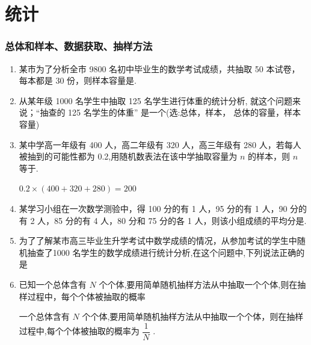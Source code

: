 \chapter{统计}

\subsection*{总体和样本、数据获取、抽样方法}
\begin{enumerate}
    \item 某市为了分析全市 9800 名初中毕业生的数学考试成绩，共抽取 50 本试卷， 每本都是 30 份，则样本容量是.
    
    \item 从某年级 1000 名学生中抽取 125 名学生进行体重的统计分析, 就这个问题来说；“抽查的 125 名学生的体重” 是一个(选:总体，样本， 总体的容量，样本容量)

    \item 某中学高一年级有 400 人，高二年级有 320 人，高三年级有 280 人，若每人被抽到的可能性都为 0.2,用随机数表法在该中学抽取容量为 $n$ 的样本，则 $n$ 等于.
    \begin{jieda}
        $0.2 \times (400+320+280) = 200$
    \end{jieda}

    \item 某学习小组在一次数学测验中，得 100 分的有 1 人，95 分的有 1 人，90 分的有 2 人，85 分的有 4 人，80 分和 75 分的各 1 人，则该小组成绩的平均分是.

    \item 为了了解某市高三毕业生升学考试中数学成绩的情况，从参加考试的学生中随机抽查了1000 名学生的数学成绩进行统计分析,在这个问题中,下列说法正确的是
    
    \item 已知一个总体含有 ${N}$ 个个体,要用简单随机抽样方法从中抽取一个个体,则在抽样过程中，每个个体被抽取的概率
    \begin{jieda}
        一个总体含有 $N$ 个个体,要用简单随机抽样方法从中抽取一个个体，则在抽样过程中,每个个体被抽取的概率为 $\dfrac{1}{N}$ .
    \end{jieda}
    

\end{enumerate}
